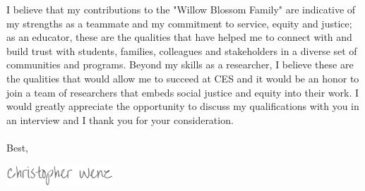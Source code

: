 \documentclass[11pt, a4paper]{awesome-cv}
\begin{document}
\begin{cvletter}
I believe that my contributions to the "Willow Blossom Family" are indicative of my strengths as a teammate and my commitment to service, equity and justice; as an educator, these are the qualities that have helped me to connect with and build trust with students, families, colleagues and stakeholders in a diverse set of communities and programs. Beyond my skills as a researcher, I believe these are the qualities that would allow me to succeed at CES and it would be an honor to join a team of researchers that embeds social justice and equity into their work. I would greatly appreciate the opportunity to discuss my qualifications with you in an interview and I thank you for your consideration. 
\\\\
Best,
\end{cvletter}

\includegraphics[width=4cm, height=0.8cm]{./img/sig.png}
\end{document}
